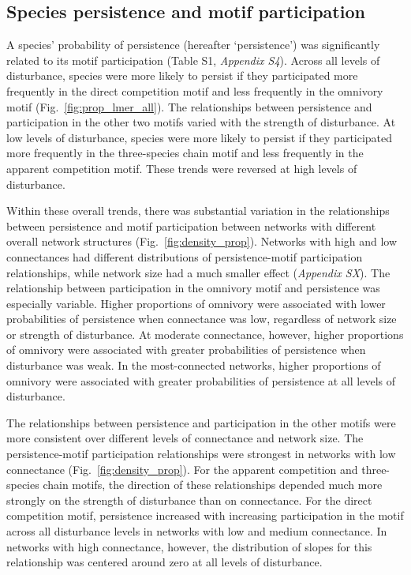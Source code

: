 \documentclass[12pt]{article}
\begin{document}
\begin{spacing}{2.0}
    \subsection*{Species persistence and motif participation} 

        A species' probability of persistence (hereafter `persistence') was significantly related to its motif participation (Table S1, \emph{Appendix S4}).
        Across all levels of disturbance, species were more likely to persist if they participated more frequently in the direct competition motif and less frequently in the omnivory motif (Fig.~\ref{fig:prop_lmer_all}).
        The relationships between persistence and participation in the other two motifs varied with the strength of disturbance.
        At low levels of disturbance, species were more likely to persist if they participated more frequently in the three-species chain motif and less frequently in the apparent competition motif.
        These trends were reversed at high levels of disturbance.
    

        Within these overall trends, there was substantial variation in the relationships between persistence and motif participation between networks with different overall network structures (Fig.~\ref{fig:density_prop}).
        Networks with high and low connectances had different distributions of persistence-motif participation relationships, while network size had a much smaller effect (\emph{Appendix SX}).
        The relationship between participation in the omnivory motif and persistence was especially variable.
        Higher proportions of omnivory were associated with lower probabilities of persistence when connectance was low, regardless of network size or strength of disturbance.
        At moderate connectance, however, higher proportions of omnivory were associated with greater probabilities of persistence when disturbance was weak.
        In the most-connected networks, higher proportions of omnivory were associated with greater probabilities of persistence at all levels of disturbance.

        The relationships between persistence and participation in the other motifs were more consistent over different levels of connectance and network size.
        The persistence-motif participation relationships were strongest in networks with low connectance (Fig.~\ref{fig:density_prop}).
        For the apparent competition and three-species chain motifs, the direction of these relationships depended much more strongly on the strength of disturbance than on connectance.
        For the direct competition motif, persistence increased with increasing participation in the motif across all disturbance levels in networks with low and medium connectance.
        In networks with high connectance, however, the distribution of slopes for this relationship was centered around zero at all levels of disturbance.



\end{spacing}
\end{document}
